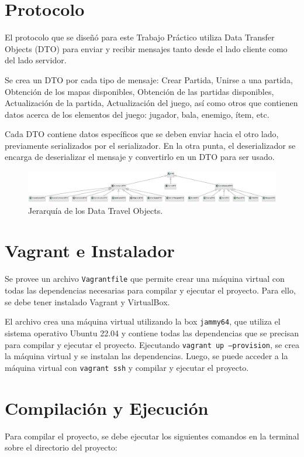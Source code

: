 \documentclass[titlepage,a4paper]{article}
\begin{document}
\section{Protocolo}
El protocolo que se diseñó para este Trabajo Práctico utiliza Data Transfer Objects (DTO) para enviar y recibir mensajes tanto desde el lado cliente como del lado servidor.

Se crea un DTO por cada tipo de mensaje: Crear Partida, Unirse a una partida, Obtención de los mapas disponibles, Obtención de las partidas disponibles, Actualización de la partida, Actualización del juego, así como otros que contienen datos acerca de los elementos del juego: jugador, bala, enemigo, ítem, etc.

Cada DTO contiene datos específicos que se deben enviar hacia el otro lado, previamente serializados por el serializador. En la otra punta, el deserializador se encarga de deserializar el mensaje y convertirlo en un DTO para ser usado.

\begin{figure}[H]
  \centering
  \includegraphics[scale=0.28, angle=270]{images/DTO Hierarchy.png}
  \caption{Jerarquía de los Data Travel Objects.}
  \label{fig:dto}
\end{figure}


\section{Vagrant e Instalador}
Se provee un archivo \texttt{Vagrantfile} que permite crear una máquina virtual con todas las dependencias necesarias para compilar y ejecutar el proyecto. Para ello, se debe tener instalado Vagrant y VirtualBox.

El archivo crea una máquina virtual utilizando la box \texttt{jammy64}, que utiliza el sistema operativo Ubuntu 22.04 y contiene todas las dependencias que se precisan para compilar y ejecutar el proyecto. 
Ejecutando \texttt{vagrant up --provision}, se crea la máquina virtual y se instalan las dependencias. Luego, se puede acceder a la máquina virtual con \texttt{vagrant ssh} y compilar y ejecutar el proyecto.

\section{Compilación y Ejecución}
Para compilar el proyecto, se debe ejecutar los siguientes comandos en la terminal sobre el directorio del proyecto:
\end{document}
